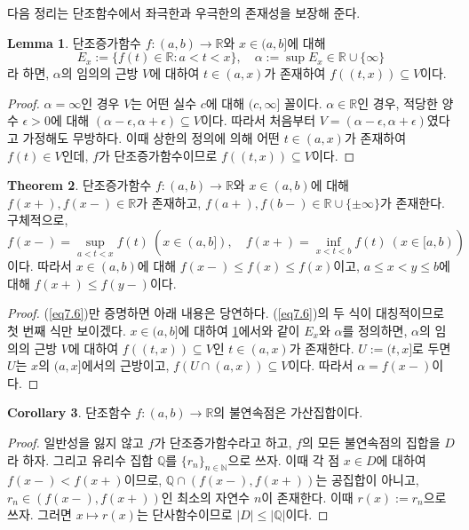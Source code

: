 \documentclass[11pt]{book}
\numberwithin{equation}{chapter}
\def\NN{\mathbb{N}}
\def\QQ{\mathbb{Q}}
\def\RR{\mathbb{R}}
\def\eps{\epsilon}
\newcommand{\abs}[1]{\left\vert#1\right\vert}
\theoremstyle{definition}
\newtheorem{thm}{Theorem}[section]
\newtheorem{cor}[thm]{Corollary}
\newtheorem{lem}[thm]{Lemma}
\begin{document}
다음 정리는 단조함수에서 좌극한과 우극한의 존재성을 보장해 준다. 

\begin{lem} \label{lem 7.5.6}
    단조증가함수 \(f : (a, b) \to \RR\)와 \(x \in (a, b]\)에 대해
    \[
        E_x := \{f(t) \in \RR : a < t < x\}, \quad \alpha := \sup E_x \in \RR \cup \{\infty\}
    \]
    라 하면, \(\alpha\)의 임의의 근방 \(V\)에 대하여 \(t \in (a, x)\)가 존재하여 \(f((t, x)) \subseteq V\)이다.
\end{lem}
\begin{proof}
    \(\alpha = \infty\)인 경우 \(V\)는 어떤 실수 \(c\)에 대해 \((c, \infty]\) 꼴이다. \(\alpha \in \RR\)인 경우, 적당한 양수 \(\eps > 0\)에 대해 \((\alpha - \eps, \alpha + \eps) \subseteq V\)이다. 따라서 처음부터 \(V = (\alpha - \eps, \alpha + \eps)\)였다고 가정해도 무방하다. 이때 상한의 정의에 의해 어떤 \(t \in (a, x)\)가 존재하여 \(f(t) \in V\)인데, \(f\)가 단조증가함수이므로 \(f((t, x)) \subseteq V\)이다.
\end{proof}

\begin{thm}
    단조증가함수 \(f : (a, b) \to \RR\)와 \(x \in (a, b)\)에 대해 \(f(x+), f(x-) \in \RR\)가 존재하고, \(f(a+), f(b-) \in \RR \cup \{\pm\infty\}\)가 존재한다. 구체적으로,
    \begin{equation}\label{eq7.6}
        f(x-) = \sup_{a<t<x}f(t) \ (x \in (a, b]), \quad f(x+) = \inf_{x<t<b}f(t) \ (x \in [a, b))
    \end{equation}
    이다. 따라서 \(x \in (a, b)\)에 대해 \(f(x-) \le f(x) \le f(x)\)이고, \(a \le x < y \le b\)에 대해 \(f(x+) \le f(y-)\)이다.
\end{thm}
\begin{proof}
    (\ref{eq7.6})만 증명하면 아래 내용은 당연하다. (\ref{eq7.6})의 두 식이 대칭적이므로 첫 번째 식만 보이겠다. \(x \in (a, b]\)에 대하여 \ref{lem 7.5.6}에서와 같이 \(E_x\)와 \(\alpha\)를 정의하면, \(\alpha\)의 임의의 근방 \(V\)에 대하여 \(f((t, x)) \subseteq V\)인 \(t \in (a, x)\)가 존재한다. \(U := (t, x]\)로 두면 \(U\)는 \(x\)의 \((a, x]\)에서의 근방이고, \(f(U \cap (a, x)) \subseteq V\)이다. 따라서 \(\alpha = f(x-)\)이다.
\end{proof}


\begin{cor}
    단조함수 \(f : (a, b) \to \RR\)의 불연속점은 가산집합이다.
\end{cor}
\begin{proof}
    일반성을 잃지 않고 \(f\)가 단조증가함수라고 하고, \(f\)의 모든 불연속점의 집합을 \(D\)라 하자. 그리고 유리수 집합 \(\QQ\)를 \(\{r_n\}_{n \in \NN}\)으로 쓰자. 이때 각 점 \(x \in D\)에 대하여 \(f(x-) < f(x+)\)이므로, \(\QQ \cap (f(x-), f(x+))\)는 공집합이 아니고, \(r_n \in (f(x-), f(x+))\)인 최소의 자연수 \(n\)이 존재한다. 이때 \(r(x) := r_n\)으로 쓰자. 그러면 \(x \mapsto r(x)\)는 단사함수이므로 \(\abs{D} \le \abs{\QQ}\)이다.
\end{proof}
\end{document}
